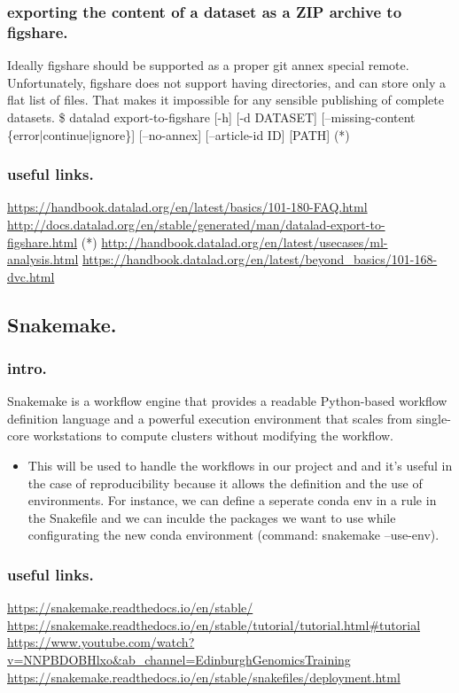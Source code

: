 \documentclass[11pt]{article}
\begin{document}
\subsubsection{exporting the content of a dataset as a ZIP archive to figshare.}
\label{sec:org625c300}
Ideally figshare should be supported as a proper git annex
special remote. Unfortunately, figshare does not support having
directories, and can store only a flat list of files. That makes
it impossible for any sensible publishing of complete datasets.
\$ datalad export-to-figshare [-h] [-d DATASET] [--missing-content \{error|continue|ignore\}] [--no-annex] [--article-id ID] [PATH]	(*)

\subsubsection{useful links.}
\label{sec:org26540f8}
\url{https://handbook.datalad.org/en/latest/basics/101-180-FAQ.html}
\url{http://docs.datalad.org/en/stable/generated/man/datalad-export-to-figshare.html}  (*)
\url{http://handbook.datalad.org/en/latest/usecases/ml-analysis.html}
\url{https://handbook.datalad.org/en/latest/beyond\_basics/101-168-dvc.html}


\subsection{Snakemake.}
\label{sec:orgb231407}
\subsubsection{intro.}
\label{sec:org7de0758}
Snakemake is a workflow engine that provides a readable
Python-based workflow definition language and a powerful
execution environment that scales from single-core workstations
to compute clusters without modifying the workflow.
\begin{itemize}
\item This will be used to handle the workflows in our project and
and it's useful in the case of reproducibility because it allows
the definition and the use of environments. For instance, we can
define a seperate conda env in a rule in the Snakefile and
we can inculde the packages we want to use while configurating
the new conda environment (command: snakemake --use-env).
\end{itemize}
\subsubsection{useful links.}
\label{sec:org49341cc}
\url{https://snakemake.readthedocs.io/en/stable/}
\url{https://snakemake.readthedocs.io/en/stable/tutorial/tutorial.html\#tutorial}
\url{https://www.youtube.com/watch?v=NNPBDOBHlxo\&ab\_channel=EdinburghGenomicsTraining}
\url{https://snakemake.readthedocs.io/en/stable/snakefiles/deployment.html}
\end{document}
